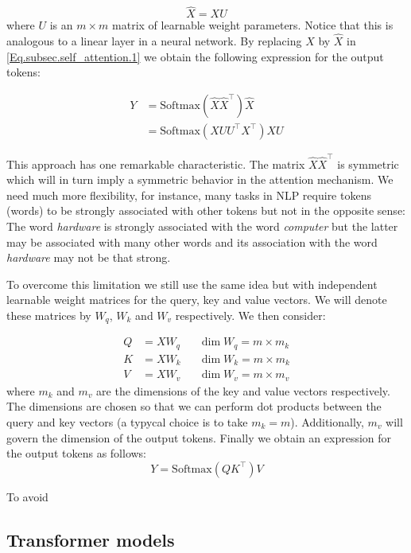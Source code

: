     \[ \widehat{X} = X U \]
    where $U$ is an $m \times m$ matrix of learnable weight parameters. Notice that this is analogous to a linear layer in a neural network. By replacing $X$ by $\widehat{X}$ in \eqref{Eq.subsec.self_attention.1} we obtain the following expression for the output tokens:

    \begin{align}\label{Eq.subsec.self_attention.2}
        Y &= \textrm{Softmax}(\widehat{X} \widehat{X}^\top) \widehat{X} \nonumber \\
        &= \textrm{Softmax}(X U U^\top X^\top) X U 
    \end{align}

    \begin{remark}
        This approach has one remarkable characteristic. The matrix $\widehat{X}\widehat{X}^\top$ is symmetric which will in turn imply a symmetric behavior in the attention mechanism. We need much more flexibility, for instance, many tasks in NLP require tokens (words) to be strongly associated with other tokens but not in the opposite sense: The word \textit{hardware} is strongly associated with the word \textit{computer} but the latter may be associated with many other words and its association with the word \textit{hardware} may not be that strong. 
    \end{remark}

    To overcome this limitation we still use the same idea but with independent learnable weight matrices for the query, key and value vectors. We will denote these matrices by $W_q$, $W_k$ and $W_v$ respectively. We then consider: 

    \begin{align*}
        Q &= X W_q  &&\dim W_q = m\times m_k \\ 
        K &= X W_k  &&\dim W_k = m\times m_k \\
        V &= X W_v &&\dim W_v = m\times m_v
    \end{align*}
    where $m_k$ and $m_v$ are the dimensions of the key and value vectors respectively. The dimensions are chosen so that we can perform dot products between the query and key vectors (a typycal choice is to take $m_k= m$). Additionally, $m_v$ will govern the dimension of the output tokens. Finally we obtain an expression for the output tokens as follows:
    \begin{equation}\label{Eq.subsec.self_attention.3}
        Y = \textrm{Softmax}(Q K^\top) V 
    \end{equation}
    
    \begin{remark}
        To avoid 
    \end{remark}

\subsection{Transformer models}\label{subsec:transformer_models}
